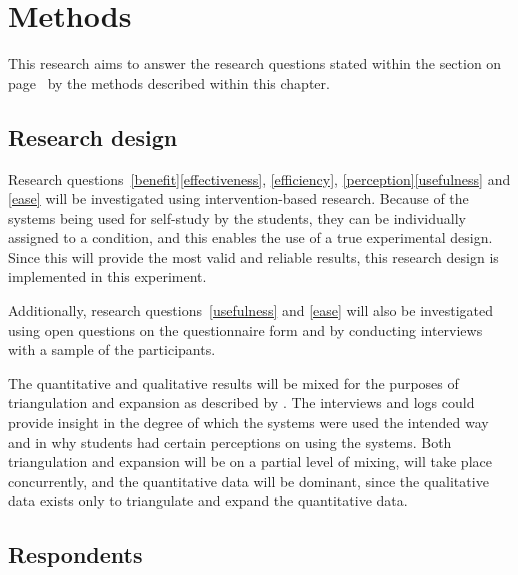 \chapter{Methods}
\label{ch:methods}

This research aims to answer the research questions stated within the  section on page~\pageref{sec:intro_evaluation} by the methods described within this chapter.

\section{Research design}
\label{sec:researchdesign}

Research questions~\ref{benefit}\ref{effectiveness}, \ref{efficiency}, \ref{perception}\ref{usefulness} and \ref{ease} will be investigated using intervention-based research. Because of the systems being used for self-study by the students, they can be individually assigned to a condition, and this enables the use of a true experimental design. Since this will provide the most valid and reliable results, this research design is implemented in this experiment.

Additionally, research questions~\ref{usefulness} and \ref{ease} will also be investigated using open questions on the questionnaire form and by conducting interviews with a sample of the participants.

The quantitative and qualitative results will be mixed for the purposes of triangulation and expansion as described by . The interviews and logs could provide insight in the degree of which the systems were used the intended way and in why students had certain perceptions on using the systems. Both triangulation and expansion will be on a partial level of mixing, will take place concurrently, and the quantitative data will be dominant, since the qualitative data exists only to triangulate and expand the quantitative data. 

\section{Respondents}
\label{sec:respondents}

